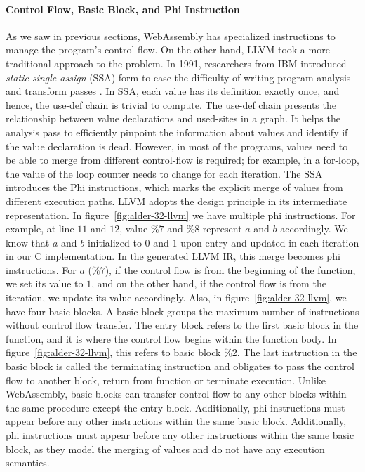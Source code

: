\paragraph{Control Flow, Basic Block, and Phi Instruction}
As we saw in previous sections, WebAssembly has specialized instructions to manage the program's control flow. On the other hand, LLVM took a more traditional approach to the problem. In 1991, researchers from IBM introduced \emph{static single assign} (SSA) form to ease the difficulty of writing program analysis and transform passes \cite{ibm-ssa}. In SSA, each value has its definition exactly once, and hence, the use-def chain is trivial to compute. The use-def chain presents the relationship between value declarations and used-sites in a graph. It helps the analysis pass to efficiently pinpoint the information about values and identify if the value declaration is dead. However, in most of the programs, values need to be able to merge from different control-flow is required; for example, in a for-loop, the value of the loop counter needs to change for each iteration. The SSA introduces the Phi instructions, which marks the explicit merge of values from different execution paths. LLVM adopts the design principle in its intermediate representation. In figure~\ref{fig:alder-32-llvm} we have multiple phi instructions. For example, at line $11$ and $12$, value $\%7$ and $\%8$ represent $a$ and $b$ accordingly. We know that $a$ and $b$ initialized to $0$ and $1$ upon entry and updated in each iteration in our C implementation. In the generated LLVM IR, this merge becomes phi instructions. For $a$ ($\%7$), if the control flow is from the beginning of the function, we set its value to $1$, and on the other hand, if the control flow is from the iteration, we update its value accordingly. Also, in figure~\ref{fig:alder-32-llvm}, we have four basic blocks. A basic block groups the maximum number of instructions without control flow transfer. The entry block refers to the first basic block in the function, and it is where the control flow begins within the function body. In figure~\ref{fig:alder-32-llvm}, this refers to basic block $\%2$. The last instruction in the basic block is called the terminating instruction and obligates to pass the control flow to another block, return from function or terminate execution. Unlike WebAssembly, basic blocks can transfer control flow to any other blocks within the same procedure except the entry block. Additionally, phi instructions must appear before any other instructions within the same basic block. Additionally, phi instructions must appear before any other instructions within the same basic block, as they model the merging of values and do not have any execution semantics. 

